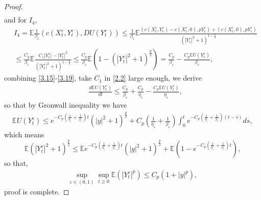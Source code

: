 \documentclass[11pt,reqno]{amsart}
\numberwithin{equation}{section}
\begin{document}
\begin{proof}
\begin{equation}
\begin{split}
		\end{split}
	\end{equation}
	and for $I_{4}$,
	\begin{equation}\label{3.19}
		\begin{split}
			&I_{4}=\mathbb{E} \frac{1}{\beta_{\varepsilon}}( c(X_{t}^{\varepsilon},Y_{t}^{\varepsilon}),DU(Y_{t}^{\varepsilon})) \leq \frac{1}{\beta_{\varepsilon}} \mathbb{E} \frac{( c(X_{t}^{\varepsilon},Y_{t}^{\varepsilon})-c(X_{t}^{\varepsilon},0),pY_{t}^{\varepsilon}) +( c(X_{t}^{\varepsilon},0),pY_{t}^{\varepsilon})}{(|Y_{t}^{\varepsilon}|^{2}+1)^{1-\frac{p}{2}}}\\
			&\leq  \frac{C_{p}}{\beta_{\varepsilon}}\mathbb{E} \frac{C_{1}|Y_{t}^{\varepsilon}|-|Y_{t}^{\varepsilon}|^{2}}{(|Y_{t}^{\varepsilon}|^{2}+1)^{1-\frac{p}{2}}}\leq \frac{C_{p}}{\beta_{\varepsilon}}\mathbb{E}\left( 1-(|Y_{t}^{\varepsilon}|^{2}+1)^{\frac{p}{2}}\right)=\frac{C_{p}}{\beta_{\varepsilon}}-\frac{C_{p}\mathbb{E}U(Y_{t}^{\varepsilon})}{\beta_{\varepsilon}},  
		\end{split}
	\end{equation}
	combining \eqref{3.15}-\eqref{3.19}, take $C_{1}$ in \eqref{2.2} large enough, we derive
	\begin{equation}\label{3.20}
		\begin{split}
			&\frac{d\mathbb{E}U(Y_{t}^{\varepsilon})}{dt}\leq\frac{C_{p}}{\beta_{\varepsilon}}+\frac{C_{p}}{\eta_{\varepsilon}}-\frac{C_{p}\mathbb{E}U(Y_{t}^{\varepsilon})}{\eta_{\varepsilon}},\nonumber
		\end{split}
	\end{equation}
	so that by Gronwall inequality we have 
	\begin{equation}\label{3.21}
		\begin{split}
			\mathbb{E}U(Y_{t}^{\varepsilon})\leq e^{-C_{p}(\frac{1}{\eta_{\varepsilon}}+\frac{1}{\beta_{\varepsilon}})t}(|y|^{2}+1)^{\frac{p}{2}}+C_{p}\left( \frac{1}{\eta_{\varepsilon}}+\frac{1}{\beta_{\varepsilon}}\right) \int^{t}_{0}e^{-C_{p}(\frac{1}{\eta_{\varepsilon}}+\frac{1}{\beta_{\varepsilon}})(t-s)}ds,
		\end{split}\nonumber
	\end{equation}
	which means
	$$\mathbb{E}(|Y_{t}^{\varepsilon}|^{2}+1)^{\frac{p}{2}}\leq \mathbb{E}e^{-C_{p}(\frac{1}{\eta_{\varepsilon}}+\frac{1}{\beta_{\varepsilon}})t}(|y|^{2}+1)^{\frac{p}{2}}+\mathbb{E}(1-e^{-C_{p}(\frac{1}{\eta_{\varepsilon}}+\frac{1}{\beta_{\varepsilon}})t}),$$
	so that,
	\begin{equation}\label{3.22}
		\begin{split}
			\sup\limits_{\varepsilon\in (0,1)}\sup\limits_{t\geq0} \mathbb{E}\left(|Y_{t}^{\varepsilon}|^{p}\right)\leq C_{p}(1+|y|^{p}),
		\end{split}
	\end{equation}
proof is complete.
\end{proof}
\end{document}
